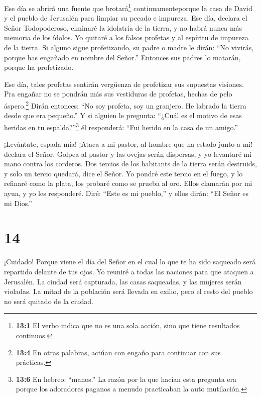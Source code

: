  Ese día se abrirá una fuente que brotará\footnote{\textbf{13:1}
  El verbo indica que no es una sola acción, sino que tiene resultados
  continuos.} continuamenteporque la casa de David y el pueblo de
Jerusalén para limpiar su pecado e impureza.  Ese día,
declara el Señor Todopoderoso, elminaré la idolatría de la tierra, y no
habrá nunca más memoria de los ídolos. Yo quitaré a los falsos profetas
y al espíritu de impureza de la tierra.  Si alguno sigue
profetizando, su padre o madre le dirán: ``No vivirás, porque has
engañado en nombre del Señor.'' Entonces sus padres lo matarán, porque
ha profetizado.

 Ese día, tales profetas sentirán vergüenza de profetizar
sus supuestas visiones. Pra engañar no se pondrán más sus vestiduras de
profetas, hechas de pelo áspero.\footnote{\textbf{13:4} En otras
  palabras, actúan con engaño para continuar con sus prácticas.}
 Dirán entonces: ``No soy profeta, soy un granjero. He
labrado la tierra desde que era pequeño.''  Y si alguien le
pregunta: ``¿Cuál es el motivo de esas heridas en tu
espalda?''\footnote{\textbf{13:6} En hebreo: ``manos.'' La razón por la
  que hacían esta pregunta era porque los adoradores paganos a menudo
  practicaban la auto mutilación.} él responderá: ``Fui herido en la
casa de un amigo.''

 ¡Levántate, espada mía! ¡Ataca a mi pastor, al hombre que
ha estado junto a mi! declara el Señor. Golpea al pastor y las ovejas
serán dispersas, y yo levantaré mi mano contra los corderos.
 Dos tercios de los habitants de la tierra serán destruids,
y solo un tercio quedará, dice el Señor.  Yo pondré este
tercio en el fuego, y lo refinaré como la plata, los probaré como se
prueba al oro. Ellos clamarán por mi ayua, y yo les responderé. Diré:
``Este es mi pueblo,'' y ellos dirán: ``El Señor es mi Dios.''

\hypertarget{section-13}{%
\section{14}\label{section-13}}

 ¡Cuidado! Porque viene el día del Señor en el cual lo que
te ha sido saqueado será repartido delante de tus ojos.  Yo
reuniré a todas las naciones para que ataquen a Jerusalén. La ciudad
será capturada, las casas saqueadas, y las mujeres serán violadas. La
mitad de la población será llevada en exilio, pero el resto del pueblo
no será quitado de la ciudad.

